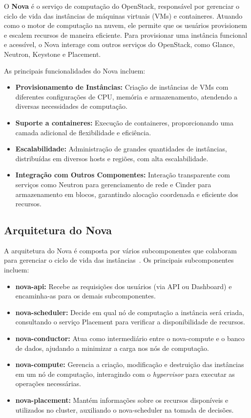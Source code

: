 O \textbf{Nova} é o serviço de computação do OpenStack, responsável por gerenciar o ciclo de vida das instâncias de máquinas virtuais (VMs) e containeres. Atuando como o motor de computação na nuvem, ele permite que os usuários provisionem e escalem recursos de maneira eficiente. Para provisionar uma instância funcional e acessível, o Nova interage com outros serviços do OpenStack, como Glance, Neutron, Keystone e Placement.

As principais funcionalidades do Nova incluem:

\begin{itemize}
    \item \textbf{Provisionamento de Instâncias:} Criação de instâncias de VMs com diferentes configurações de CPU, memória e armazenamento, atendendo a diversas necessidades de computação.
    \item \textbf{Suporte a containeres:} Execução de containeres, proporcionando uma camada adicional de flexibilidade e eficiência.
    \item \textbf{Escalabilidade:} Administração de grandes quantidades de instâncias, distribuídas em diversos hosts e regiões, com alta escalabilidade.
    \item \textbf{Integração com Outros Componentes:} Interação transparente com serviços como Neutron para gerenciamento de rede e Cinder para armazenamento em blocos, garantindo alocação coordenada e eficiente dos recursos.
\end{itemize}

\subsection{Arquitetura do Nova}

A arquitetura do Nova é composta por vários subcomponentes que colaboram para gerenciar o ciclo de vida das instâncias~\citep{OpenStackNovaArchitecture}. Os principais subcomponentes incluem:

\begin{itemize}
    \item \textbf{nova-api:} Recebe as requisições dos usuários (via API ou Dashboard) e encaminha-as para os demais subcomponentes.
    \item \textbf{nova-scheduler:} Decide em qual nó de computação a instância será criada, consultando o serviço Placement para verificar a disponibilidade de recursos.
    \item \textbf{nova-conductor:} Atua como intermediário entre o nova-compute e o banco de dados, ajudando a minimizar a carga nos nós de computação.
    \item \textbf{nova-compute:} Gerencia a criação, modificação e destruição das instâncias em um nó de computação, interagindo com o \textit{hypervisor} para executar as operações necessárias.
    \item \textbf{nova-placement:} Mantém informações sobre os recursos disponíveis e utilizados no cluster, auxiliando o nova-scheduler na tomada de decisões.
\end{itemize}


